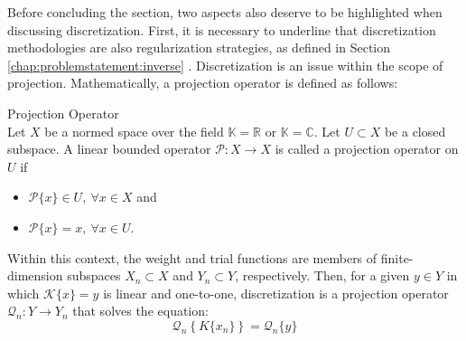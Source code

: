 			Before concluding the section, two aspects also deserve to be highlighted when discussing discretization. First, it is necessary to underline that discretization methodologies are also regularization strategies, as defined in Section \ref{chap:problemstatement:inverse} \citep{kirsch2011introduction}. Discretization is an issue within the scope of projection. Mathematically, a projection operator is defined as follows:
			\vspace{1.5ex}
			\begin{definition}\label{def:3:projection}
				Projection Operator\\
				Let $X$ be a normed space over the field $\mathbb{K}=\mathbb{R}$ or $\mathbb{K}=\mathbb{C}$. Let $U\subset X$ be a closed subspace. A linear bounded operator $\mathcal{P} : X\rightarrow X$ is called a projection operator on $U$ if
				\begin{itemize}
					\item $\mathcal{P}\{x\} \in U, ~\forall x\in X$ and
					\item $\mathcal{P}\{x\} = x,~ \forall x\in U$.
				\end{itemize}
			\end{definition}
			\vspace{1.5ex}
			Within this context, the weight and trial functions are members of finite-dimension subspaces $X_n\subset X$ and $Y_n\subset Y$, respectively. Then, for a given $y\in Y$ in which $\mathcal{K}\{x\} = y$ is linear and one-to-one, discretization is a projection operator $\mathcal{Q}_n : Y\rightarrow Y_n$ that solves the equation:
			\begin{equation}
				\mathcal{Q}_n\left\{ K\{x_n\} \right\} = \mathcal{Q}_n\{y\} \label{eq:3:discretization:projection:0}
			\end{equation}
			
